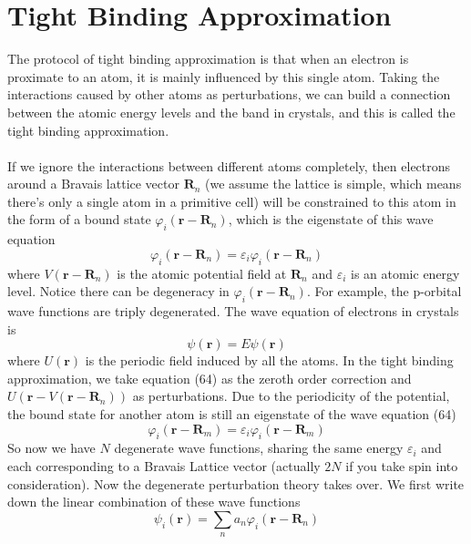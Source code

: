 \documentclass{article}
\begin{document}
\section{Tight Binding Approximation}
The protocol of tight binding approximation is that when an electron is proximate to an atom, it is mainly influenced by this single atom. Taking the interactions caused by other atoms as perturbations, we can build a connection between the atomic energy levels and the band in crystals, and this is called the tight binding approximation.\\
\\
If we ignore the interactions between different atoms completely, then electrons around a Bravais lattice vector $\mathbf{R}_n$ (we assume the lattice is simple, which means there's only a single atom in a primitive cell) will be constrained to this atom in the form of a bound state $\varphi_i(\mathbf{r}-\mathbf{R}_n)$, which is the eigenstate of this wave equation\begin{equation}
    [-\frac{\hbar^2}{2m}\nabla^2+V(\mathbf{r}-\mathbf{R}_n)]\varphi_i(\mathbf{r}-\mathbf{R}_n)=\varepsilon_i\varphi_i(\mathbf{r}-\mathbf{R}_n)
\end{equation}
where $V(\mathbf{r}-\mathbf{R}_n)$ is the atomic potential field at $\mathbf{R}_n$ and $\varepsilon_i$ is an atomic energy level. Notice there can be degeneracy in $\varphi_i(\mathbf{r}-\mathbf{R}_n)$. For example, the p-orbital wave functions are triply degenerated. The wave equation of electrons in crystals is\begin{equation}
    [-\frac{\hbar^2}{2m}\nabla^2+U(\mathbf{r})]\psi(\mathbf{r})=E\psi(\mathbf{r})
\end{equation}
where $U(\mathbf{r})$ is the periodic field induced by all the atoms. In the tight binding approximation, we take equation (64) as the zeroth order correction and $U(\mathbf{r}-V(\mathbf{r}-\mathbf{R}_n))$ as perturbations. Due to the periodicity of the potential, the bound state for another atom is still an eigenstate of the wave equation (64)\begin{equation}
    [-\frac{\hbar^2}{2m}\nabla^2+V(\mathbf{r}-\mathbf{R}_n)]\varphi_i(\mathbf{r}-\mathbf{R}_m)=\varepsilon_i\varphi_i(\mathbf{r}-\mathbf{R}_m)
\end{equation}
So now we have $N$ degenerate wave functions, sharing the same energy $\varepsilon_i$ and each corresponding to a Bravais Lattice vector (actually $2N$ if you take spin into consideration). Now the degenerate perturbation theory takes over. We first write down the linear combination of these wave functions\begin{equation}
    \psi_i(\mathbf{r})=\sum_n{a_n}\varphi_i(\mathbf{r}-\mathbf{R}_n)
\end{equation}
\end{document}
